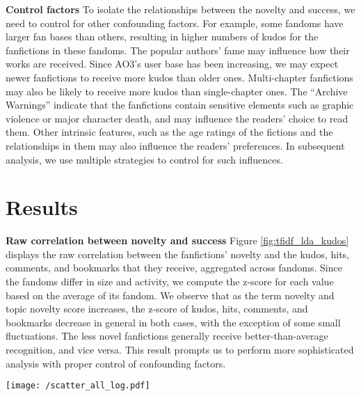 \documentclass[letterpaper]{article} %
\begin{document}
\textbf{Control factors}    To isolate the relationships between the novelty and success, we need to control for other confounding factors. For example, some fandoms have larger fan bases than others, resulting in higher numbers of kudos for the fanfictions in these fandoms. The popular authors' fame may influence how their works are received. Since AO3's user base has been increasing, we may expect newer fanfictions to receive more kudos than older ones. Multi-chapter fanfictions may also be likely to receive more kudos than single-chapter ones. The ``Archive Warnings'' indicate that the fanfictions contain sensitive elements such as graphic violence or major character death, and may influence the readers' choice to read them. Other intrinsic features, such as the age ratings of the fictions and the relationships in them may also influence the readers' preferences. In subsequent analysis, we use multiple strategies to control for such influences.


\section{Results}

\textbf{Raw correlation between novelty and success}    Figure \ref{fig:tfidf_lda_kudos} displays the raw correlation between the fanfictions' novelty and the kudos, hits, comments, and bookmarks that they receive, aggregated across fandoms. Since the fandoms differ in size and activity, we compute the z-score for each value based on the average of its fandom. We observe that as the term novelty and topic novelty score increases, the z-score of kudos, hits, comments, and bookmarks decrease in general in both cases, with the exception of some small fluctuations. The less novel fanfictions generally receive better-than-average recognition, and vice versa. This result prompts us to perform more sophisticated analysis with proper control of confounding factors.

\begin{figure*}
    \centering
          \texttt{[image: /scatter\_all\_log.pdf]}
        \caption{The relationships between novelty and success, measured by kudos, hits, comments, and bookmarks. The horizontal axes are the novelty scores, and the vertical axes are the corresponding average of the z-score of kudos, hits, comments, and bookmarks in bins with bin size = 0.1 (left) and 0.05 (right). The confidence intervals obtained from bootstrap resampling are shown. }
        \label{fig:tfidf_lda_kudos}
\end{figure*}
\end{document}
